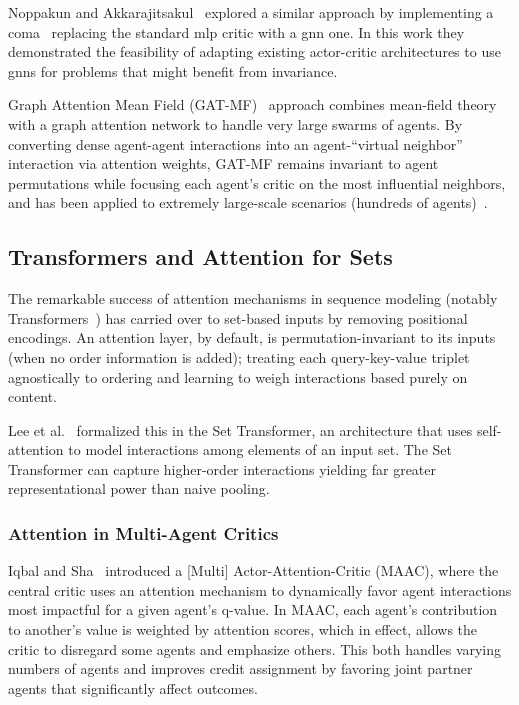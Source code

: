 \documentclass{article}
\begin{document}
Noppakun and Akkarajitsakul~\cite{noppakun2022} explored a similar
approach by implementing a \gls{coma}~\cite{foerster2018}
replacing the standard \gls{mlp} critic with a \gls{gnn} one.
In this work they demonstrated the feasibility of adapting
existing actor-critic architectures to use \glspl{gnn}
for problems that might benefit from invariance.

Graph Attention Mean Field (GAT-MF)~\cite{hao2023} approach combines mean-field 
theory with a graph attention network to handle very large swarms of agents. 
By converting dense agent-agent interactions into an agent-“virtual neighbor” 
interaction via attention weights, GAT-MF remains invariant to agent permutations 
while focusing each agent's critic on the most influential neighbors, 
and has been applied to extremely large-scale scenarios (hundreds of agents)~\cite{hao2022}.


\subsection{Transformers and Attention for Sets}

The remarkable success of attention mechanisms in sequence modeling 
(notably Transformers~\cite{vaswani2017}) has carried over to set-based 
inputs by removing positional encodings. An attention layer, by default, 
is permutation-invariant to its inputs (when no order information is added); 
treating each query-key-value triplet agnostically to ordering and learning to 
weigh interactions based purely on content. 

Lee et al.~\cite{lee2019} 
formalized this in the Set Transformer, an architecture that uses 
self-attention to model interactions among elements of an input set. 
The Set Transformer can capture higher-order interactions
yielding far greater representational power than naive pooling. 

\subsubsection{Attention in Multi-Agent Critics}
Iqbal and Sha~\cite{iqbal2019} introduced a [Multi] Actor-Attention-Critic (MAAC), 
where the central critic uses an attention mechanism to dynamically 
favor agent interactions most impactful for a given agent's \Gls{q}-value. 
In MAAC, each agent's contribution to another's value is weighted by attention scores, 
which in effect, allows the critic to disregard some agents and emphasize others. 
This both handles varying numbers of agents and improves credit assignment by 
favoring joint partner agents that significantly affect outcomes. 
\end{document}
